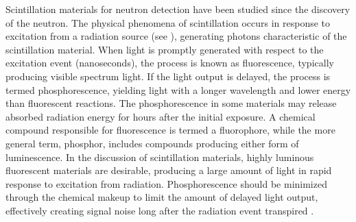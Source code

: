 \documentclass[../../../main.tex]{subfiles}%
\begin{document}
%
    \Xsubsection%
    Scintillation materials for neutron detection have been studied since the discovery of the neutron.
    The physical phenomena of scintillation occurs in response to excitation from a radiation source (see ), generating photons characteristic of the scintillation material.
    When light is promptly generated with respect to the excitation event (nanoseconds), the process is known as fluorescence, typically producing visible spectrum light.
    If the light output is delayed, the process is termed phosphorescence, yielding light with a longer wavelength and lower energy than fluorescent reactions.
    The phosphorescence in some materials may release absorbed radiation energy for hours after the initial exposure. 
    A chemical compound responsible for fluorescence is termed a fluorophore, while the more general term, phosphor, includes compounds producing either form of luminescence.    
    In the discussion of scintillation materials, highly luminous fluorescent materials are desirable, producing a large amount of light in rapid response to excitation from radiation.
    Phosphorescence should be minimized through the chemical makeup to limit the amount of delayed light output, effectively creating signal noise long after the radiation event transpired \cite{book:Knoll_2010}.
\end{document}
